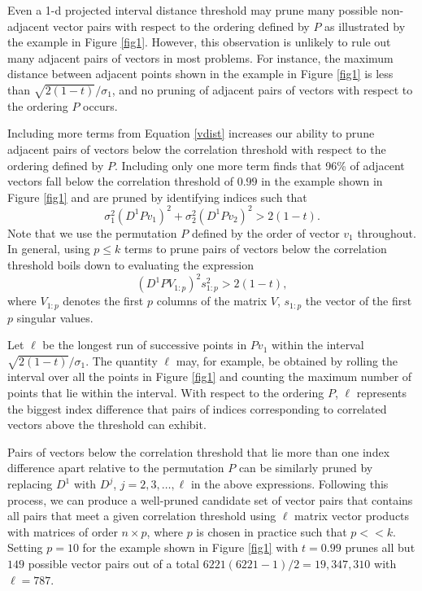\documentclass{article}
\numberwithin{algorithmctr}{section}
\begin{document}
Even a 1-d projected interval distance threshold may prune many possible
non-adjacent vector pairs with respect to the ordering defined by $P$ as
illustrated by the example in Figure \ref{fig1}.  However, this observation is
unlikely to rule out many adjacent pairs of vectors in most problems.  For
instance, the maximum distance between adjacent points shown in the example in
Figure \ref{fig1} is less than $\sqrt{2(1-t)}/\sigma_1$, and no pruning of
adjacent pairs of vectors with respect to the ordering $P$ occurs.

Including more terms from Equation \ref{vdist} increases our ability to prune
adjacent pairs of vectors below the correlation threshold with respect to the
ordering defined by $P$.  Including only one more term finds that 96\% of
adjacent vectors fall below the correlation threshold of $0.99$ in the
example shown in Figure \ref{fig1} and are pruned by identifying indices such
that
\[
\sigma_1^2 (D^1 P v_1)^2 +
\sigma_2^2 (D^1 P v_2)^2 > 2(1-t).
\]
Note that we use the permutation $P$ defined by the order of vector $v_1$
throughout.  In general, using $p\le k$ terms to prune pairs of vectors
below the correlation threshold boils down to evaluating the expression
\begin{equation}\label{proj}
(D^1 P V_{1:p} )^2 s_{1:p}^2 > 2(1-t),
\end{equation}
where 
$V_{1:p}$ denotes the first $p$ columns of the
matrix $V$, $s_{1:p}$ the vector of the first $p$ singular values.

Let $\ell$ be the longest run of successive points in $P v_1$ within the
interval $\sqrt{2(1-t)}/\sigma_1$.  The quantity $\ell$ may, for example, be
obtained by rolling the interval over all the points in Figure \ref{fig1} and
counting the maximum number of points that lie within the interval.  With
respect to the ordering $P$, $\ell$ represents the biggest index difference
that pairs of indices corresponding to correlated vectors above the threshold
can exhibit.

Pairs of vectors below the correlation threshold that lie more than one index
difference apart relative to the permutation $P$ can be similarly pruned by
replacing $D^1$ with $D^j$, $j=2,3,\ldots,\ell$ in the above expressions.
Following this process, we can produce a well-pruned candidate set of vector
pairs that contains all pairs that meet a given correlation threshold using
$\ell$ matrix vector products with matrices of order $n \times p$, where $p$ is
chosen in practice such that $p<<k$. Setting $p=10$ for the example shown in
Figure \ref{fig1} with $t=0.99$ prunes all but $149$ possible vector pairs out of a total
$6221(6221 - 1)/2 = 19,347,310$ with $\ell=787$.
\end{document}
